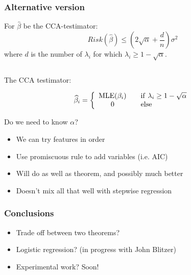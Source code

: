 \documentclass{beamer}
\newcommand{\betahat}{\widehat{\beta}}
\begin{document}
\begin{frame}
  \frametitle{Alternative version}


\begin{theorem}
For $\hat{\beta}$  be the CCA-testimator:
\[
Risk(\hat{\beta}) \le \left(2\sqrt{\alpha}+ \frac{d}{n}\right)\sigma^2
\]
where $d$ is the number of
$\lambda_i$ for which $\lambda_i \ge 1-\sqrt{\alpha}$.
\end{theorem}
\begin{overprint}

$\quad$


The CCA testimator:
  
  \begin{equation}
    \label{eq:threshold_estimator}
    \betahat_i = \left \{ 
      \begin{array}{cl}
        \textrm{MLE}(\beta_i)  & \quad {\rm if } \,\,
        \lambda_i \ge 1-\sqrt{\alpha} \\
        0 & \quad {\rm else}
      \end{array}
    \right.
  \end{equation}


Do we need to know $\alpha$?
\begin{itemize}
\item We can try features in order
\item Use promiscuous rule to add variables (i.e. AIC)
\item Will do as well as theorem, and possibly much better
\item Doesn't mix all that well with stepwise regression
\end{itemize}

\end{overprint}
\end{frame}



\begin{frame}
	\frametitle{Conclusions}

\begin{itemize}
\item Trade off between two theorems?
\item  Logistic regression? (in progress with John Blitzer)
\item Experimental work?  \pause Soon!
\end{itemize}
 
\end{frame}

 
\end{document}
